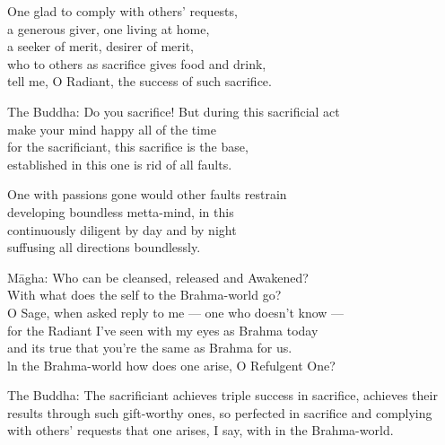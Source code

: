 \begin{MyDescription}{}
One glad to comply with others' requests,\\
a generous giver, one living at home,\\
a seeker of merit, desirer of merit,\\
who to others as sacrifice gives food and drink,\\
tell me, O Radiant, the success of such sacrifice.
\end{MyDescription}

\begin{MyDescription}{The Buddha:}
Do you sacrifice! But during this sacrificial act\\
make your mind happy all of the time\\
for the sacrificiant, this sacrifice is the base,\\
established in this one is rid of all faults.
\end{MyDescription}

\begin{MyDescription}{}
One with passions gone would other faults restrain\\
developing boundless metta-mind, in this\\
continuously diligent by day and by night\\
suffusing all directions boundlessly.
\end{MyDescription}

\begin{MyDescription}{M\=agha:}
Who can be cleansed, released and Awakened?\\
With what does the self to the Brahma-world go?\\
O Sage, when asked reply to me — one who doesn't know —\\
for the Radiant I've seen with my eyes as Brahma today\\
and its true that you're the same as Brahma for us.\\
ln the Brahma-world how does one arise, O Refulgent One?
\end{MyDescription}

\begin{MyDescription}{The Buddha:}
The sacrificiant achieves triple success in sacrifice,
achieves their results through such gift-worthy ones,
so perfected in sacrifice and complying with others' requests
that one arises, I say, with in the Brahma-world.
\end{MyDescription}


